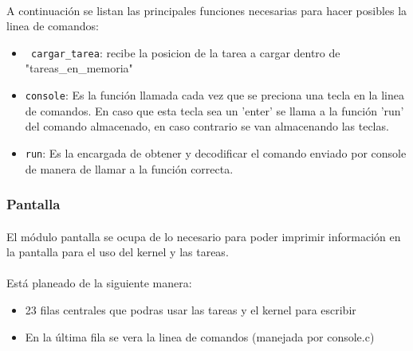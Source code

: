 \documentclass[11pt, a4paper]{article}
\begin{document}
	\paragraph{}
	A continuación se listan las principales funciones necesarias para hacer posibles la linea de comandos:
	\begin{itemize}
		\item \texttt{ cargar\_tarea}: recibe la posicion de la tarea a cargar dentro de "tareas\_en\_memoria"
		\item \texttt{console}: Es la función llamada cada vez que se preciona una tecla en la linea de comandos. En caso que esta tecla sea un 'enter' se llama a la función 'run' del comando almacenado, en caso contrario se van almacenando las teclas.
		\item \texttt{run}: Es la encargada de obtener y decodificar el comando enviado por console de manera de llamar a la función correcta.
	\end{itemize}				


\subsubsection{Pantalla}
	\paragraph{}
	El módulo pantalla se ocupa de lo necesario para poder imprimir información en la pantalla para el uso del kernel y las tareas.

	\paragraph{}
	Está planeado de la siguiente manera:
	\begin{itemize}
		\item 23 filas centrales que podras usar las tareas y el kernel para escribir
		\item En la última fila se vera la linea de comandos (manejada por console.c) 
	\end{itemize}
	 
\end{document}
